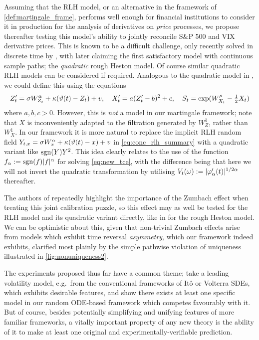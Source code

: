 Assuming that the RLH model, or an alternative in the framework of \autoref{def:martingale_frame}, performs well enough for financial institutions to consider it in production for the analysis of derivatives on \emph{price} processes, we propose thereafter testing this model's ability to jointly reconcile S\&P 500 and VIX derivative prices. This is known to be a difficult challenge, only recently solved in discrete time by \cite{guyon_2020}, with \cite{gatheral_2020} later claiming the first satisfactory model with continuous sample paths; the \emph{quadratic} rough Heston model. Of course similar quadratic RLH models can be considered if required. Analogous to the quadratic model in \cite{gatheral_2020}, we could define this using the equations
\begin{equation}
    Z'_t = \sigma W^\alpha_{Z_t} + \kappa(\vartheta(t) - Z_t) + v,\quad X'_t = a(Z'_t - b)^2 + c ,\quad  S_t=\exp(W^\rho_{X_t}-\tfrac12 X_t)
\end{equation}
where $a,b,c>0$. However, this is \emph{not} a model in our martingale framework; note that $X$ is inconveniently adapted to the filtration generated by $W^1_{Z}$, rather than $W^1_{X}$. In our framework it is more natural to replace the implicit RLH random field $Y_{t,x}=\sigma W^\alpha_x + \kappa(\vartheta(t) - x) + v$ in \autoref{eq:conc_rlh_summary} with a quadratic variant like $\mathrm{sgn}(Y)Y^2$. This idea clearly relates to the use of the function $f_\alpha := \mathrm{sgn}(f)|f|^\alpha$ for solving \autoref{eq:new_tce}, with the difference being that here we will not invert the quadratic transformation by utilising $V_t(\omega):=|\varphi_\alpha'(t)|^{1/2\alpha}$ thereafter.

The authors of \cite{gatheral_2020} repeatedly highlight the importance of the Zumbach effect when treating this joint calibration puzzle, so this effect may as well be tested for the RLH model and its quadratic variant directly, like in \cite{eleuch_2020} for the rough Heston model. We can be optimistic about this, given that non-trivial Zumbach effects arise from models which exhibit time reversal \emph{asymmetry}, which our framework indeed exhibits, clarified most plainly by the simple pathwise violation of uniqueness illustrated in \autoref{fig:nonuniqueness2}.

\vspace{4mm} The experiments proposed thus far have a common theme; take a leading volatility model, e.g.~from the conventional frameworks of It\^o or Volterra SDEs, which exhibits desirable features, and show there exists at least one specific model in our random ODE-based framework which competes favourably with it. But of course, besides potentially simplifying and unifying features of more familiar frameworks, a vitally important property of any new theory is the ability of it to make at least one original and experimentally-verifiable prediction.

